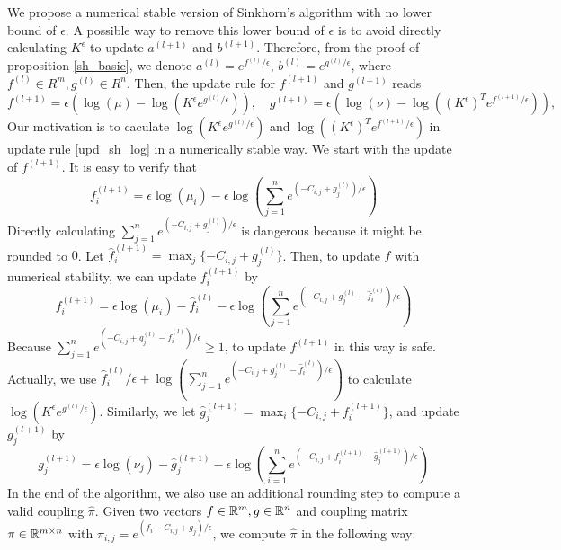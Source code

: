 We propose a numerical stable version of Sinkhorn's algorithm with no lower bound of $\epsilon$. A possible way to remove this lower bound of $\epsilon$ is to avoid directly calculating $K^\epsilon$ to update $a^{(l+1)}$ and $b^{(l+1)}$. Therefore, from the proof of proposition \ref{sh_basic}, we denote $a^{(l)}=e^{f^{(l)}/\epsilon}$, $b^{(l)}=e^{g^{(l)}/\epsilon}$, where $f^{(l)}\in R^m, g^{(l)}\in R^n$. Then, the update rule for $f^{(l+1)}$ and $g^{(l+1)}$ reads
\begin{equation}
\label{upd_sh_log}
f^{(l+1)}=\epsilon(\log(\mu)-\log(K^\epsilon e^{g^{(l)}/\epsilon})), \quad g^{(l+1)}=\epsilon(\log(\nu)-\log((K^\epsilon)^T e^{f^{(l+1)}/\epsilon})),
\end{equation}
Our motivation is to caculate $\log(K^\epsilon e^{g^{(l)}/\epsilon})$ and $\log((K^\epsilon)^T e^{f^{(l+1)}/\epsilon})$ in update rule \ref{upd_sh_log} in a numerically stable way. We start with the update of $f^{(l+1)}$. It is easy to verify that
$$
f^{(l+1)}_i = \epsilon \log(\mu_i)-\epsilon \log(\sum_{j=1}^ne^{(-C_{i,j}+g^{(l)}_j)/\epsilon})
$$
Directly calculating $\sum_{j=1}^ne^{(-C_{i,j}+g^{(l)}_j)/\epsilon}$ is dangerous because it might be rounded to $0$. Let $\hat f^{(l+1)}_i=\max_j\{-C_{i,j}+g^{(l)}_j\}$. Then, to update $f$ with numerical stability, we can update $f^{(l+1)}_i$ by
\begin{equation}
\label{sh_f_upd}
f^{(l+1)}_i = \epsilon \log(\mu_i)-\hat f^{(l)}_i-\epsilon \log(\sum_{j=1}^ne^{ (-C_{i,j}+g^{(l)}_j-\hat f^{(l)}_i)/\epsilon})
\end{equation}
Because $\sum_{j=1}^ne^{ (-C_{i,j}+g^{(l)}_j-\hat f^{(l)}_i)/\epsilon}\geqslant1$, to update $f^{(l+1)}$ in this way is safe. Actually, we use $\hat f_i^{(l)}/\epsilon+\log(\sum_{j=1}^ne^{ (-C_{i,j}+g^{(l)}_j-\hat f^{(l)}_i)/\epsilon})$ to calculate $\log(K^\epsilon e^{g^{(l)}/\epsilon})$.  Similarly, we let $\hat g^{(l+1)}_j=\max_i\{-C_{i,j}+f^{(l+1)}_i\}$, and update $g^{(l+1)}_j$ by
\begin{equation}
\label{sh_g_upd}
g^{(l+1)}_j = \epsilon \log(\nu_j)-\hat g^{(l+1)}_j-\epsilon \log(\sum_{i=1}^ne^{ (-C_{i,j}+f^{(l+1)}_i-\hat g^{(l+1)}_j)/\epsilon})
\end{equation}
In the end of the algorithm, we also use an additional rounding step to compute a valid coupling $\hat\pi$. Given two vectors $f\in\mathbb{R}^m, g\in\mathbb{R}^n$ and coupling matrix $\pi\in\mathbb{R}^{m\times n}$ with $\pi_{i,j}=e^{(f_i-C_{i,j}+g_j)/\epsilon}$, we compute $\hat\pi$ in the following way:
